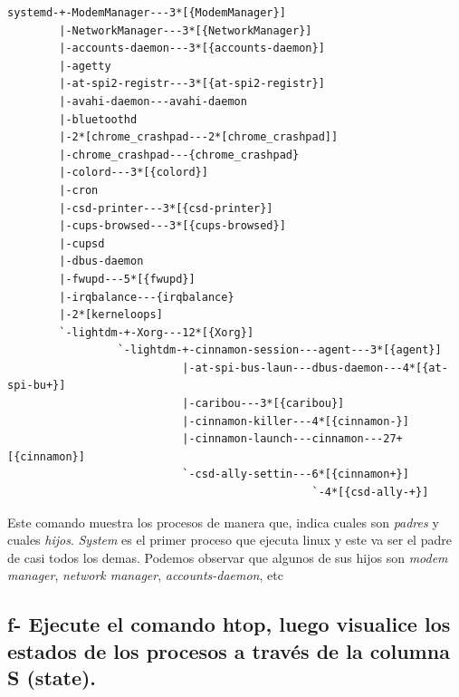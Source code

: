 \documentclass{article}
\begin{document}
\begin{commandline}
 {
\begin{verbatim}
systemd-+-ModemManager---3*[{ModemManager}]
        |-NetworkManager---3*[{NetworkManager}]
        |-accounts-daemon---3*[{accounts-daemon}]
        |-agetty
        |-at-spi2-registr---3*[{at-spi2-registr}]
        |-avahi-daemon---avahi-daemon
        |-bluetoothd
        |-2*[chrome_crashpad---2*[chrome_crashpad]]
        |-chrome_crashpad---{chrome_crashpad}
        |-colord---3*[{colord}]
        |-cron
        |-csd-printer---3*[{csd-printer}]
        |-cups-browsed---3*[{cups-browsed}]
        |-cupsd
        |-dbus-daemon
        |-fwupd---5*[{fwupd}]
        |-irqbalance---{irqbalance}
        |-2*[kerneloops]
        `-lightdm-+-Xorg---12*[{Xorg}]
                 `-lightdm-+-cinnamon-session---agent---3*[{agent}]
                           |-at-spi-bus-laun---dbus-daemon---4*[{at-spi-bu+}]
                           |-caribou---3*[{caribou}]
                           |-cinnamon-killer---4*[{cinnamon-}]
                           |-cinnamon-launch---cinnamon---27+[{cinnamon}]
                           `-csd-ally-settin---6*[{cinnamon+}]
                                               `-4*[{csd-ally-+}]
\end{verbatim}
}
\end{commandline}

\noindent
Este comando muestra los procesos de manera que, indica cuales son \textit{padres} y cuales \textit{hijos}.
\textit{System} es el primer proceso que ejecuta linux y este va ser el padre de casi todos los demas.
Podemos observar que algunos de sus hijos son \textit{modem manager}, \textit{network manager}, \textit{accounts-daemon}, etc
\subsection*{f- Ejecute el comando htop, luego visualice los estados de los procesos a través de la columna S (state).}
\end{document}
